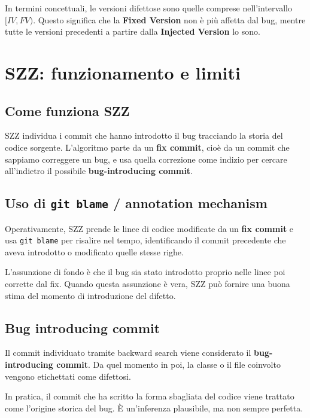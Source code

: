 In termini concettuali, le versioni difettose sono quelle comprese nell'intervallo \([IV, FV)\). Questo significa che la \textbf{Fixed Version} non è più affetta dal bug, mentre tutte le versioni precedenti a partire dalla \textbf{Injected Version} lo sono.

\section{SZZ: funzionamento e limiti}

\subsection{Come funziona SZZ}

SZZ individua i commit che hanno introdotto il bug tracciando la storia del codice sorgente. L'algoritmo parte da un \textbf{fix commit}, cioè da un commit che sappiamo correggere un bug, e usa quella correzione come indizio per cercare all'indietro il possibile \textbf{bug-introducing commit}.

\subsection{Uso di \texttt{git blame} / annotation mechanism}

Operativamente, SZZ prende le linee di codice modificate da un \textbf{fix commit} e usa \texttt{git blame} per risalire nel tempo, identificando il commit precedente che aveva introdotto o modificato quelle stesse righe.

L'assunzione di fondo è che il bug sia stato introdotto proprio nelle linee poi corrette dal fix. Quando questa assunzione è vera, SZZ può fornire una buona stima del momento di introduzione del difetto.

\subsection{Bug introducing commit}

Il commit individuato tramite backward search viene considerato il \textbf{bug-introducing commit}. Da quel momento in poi, la classe o il file coinvolto vengono etichettati come difettosi.

\begin{notaprof}
In pratica, il commit che ha scritto la forma sbagliata del codice viene trattato come l'origine storica del bug. È un'inferenza plausibile, ma non sempre perfetta.
\end{notaprof}

